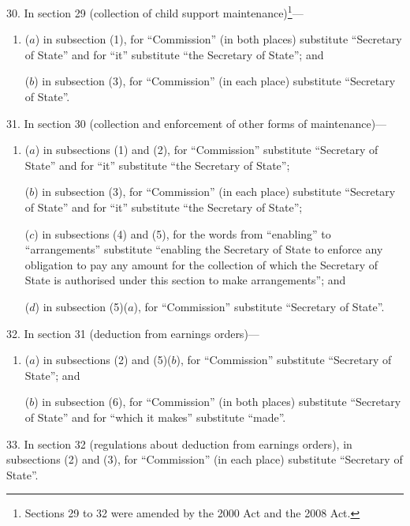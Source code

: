 \documentclass[12pt,a4paper]{article}
\begin{document}
\medskip

30.  In section 29 (collection of child support maintenance)\footnote{Sections 29 to 32 were amended by the 2000 Act and the 2008 Act.}—
\begin{enumerate}\item[]
($a$) in subsection (1), for “Commission” (in both places) substitute “Secretary of State” and for “it” substitute “the Secretary of State”; and

($b$) in subsection (3), for “Commission” (in each place) substitute “Secretary of State”.
\end{enumerate}

\medskip

31.  In section 30 (collection and enforcement of other forms of maintenance)—
\begin{enumerate}\item[]
($a$) in subsections (1) and (2), for “Commission” substitute “Secretary of State” and for “it” substitute “the Secretary of State”;

($b$) in subsection (3), for “Commission” (in each place) substitute “Secretary of State” and for “it” substitute “the Secretary of State”;

($c$) in subsections (4) and (5), for the words from “enabling” to “arrangements” substitute “enabling the Secretary of State to enforce any obligation to pay any amount for the collection of which the Secretary of State is authorised under this section to make arrangements”; and

($d$) in subsection (5)($a$), for “Commission” substitute “Secretary of State”.
\end{enumerate}

\medskip

32.  In section 31 (deduction from earnings orders)—
\begin{enumerate}\item[]
($a$) in subsections (2) and (5)($b$), for “Commission” substitute “Secretary of State”; and

($b$) in subsection (6), for “Commission” (in both places) substitute “Secretary of State” and for “which it makes” substitute “made”.
\end{enumerate}

\medskip

33.  In section 32 (regulations about deduction from earnings orders), in subsections (2) and (3), for “Commission” (in each place) substitute “Secretary of State”.

\medskip
\end{document}
